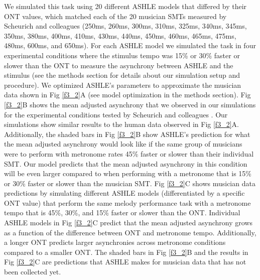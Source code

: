 \documentclass{report}
\begin{document}
We simulated this task using 20 different ASHLE models that differed by their ONT values, which matched each of the 20 musician SMTs measured by Scheurich and colleagues \cite{scheurich2018tapping} (250ms, 260ms, 300ms, 310ms, 325ms, 340ms, 345ms, 350ms, 380ms, 400ms, 410ms, 430ms, 440ms, 450ms, 460ms, 465ms, 475ms, 480ms, 600ms, and 650ms). For each ASHLE model we simulated the task in four experimental conditions where the stimulus tempo was 15\% or 30\% faster or slower than the ONT to measure the asynchrony between ASHLE and the stimulus (see the methods section for details about our simulation setup and procedure). We optimized ASHLE's parameters to approximate the musician data shown in Fig \ref{f3_2}A (see model optimization in the methods section). Fig \ref{f3_2}B shows the mean adjusted asynchrony that we observed in our simulations for the experimental conditions tested by Scheurich and colleagues \cite{scheurich2018tapping}. Our simulations show similar results to the human data observed in Fig \ref{f3_2}A. Additionally, the shaded bars in Fig \ref{f3_2}B show ASHLE's prediction for what the mean adjusted asynchrony would look like if the same group of musicians were to perform with metronome rates 45\% faster or slower than their individual SMT. Our model predicts that the mean adjusted asynchrony in this condition will be even larger compared to when performing with a metronome that is 15\% or 30\% faster or slower than the musician SMT. Fig \ref{f3_2}C shows musician data predictions by simulating different ASHLE models (differentiated by a specific ONT value) that perform the same melody performance task with a metronome tempo that is 45\%, 30\%, and 15\% faster or slower than the ONT. Individual ASHLE models in Fig \ref{f3_2}C predict that the mean adjusted asynchrony grows as a function of the difference between ONT and metronome tempo. Additionally, a longer ONT predicts larger asynchronies across metronome conditions compared to a smaller ONT. The shaded bars in Fig \ref{f3_2}B and the results in Fig \ref{f3_2}C are predictions that ASHLE makes for musician data that has not been collected yet.
\end{document}

